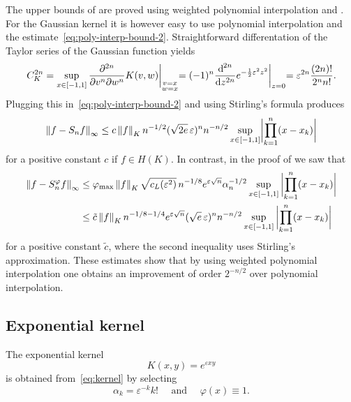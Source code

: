 \documentclass{mcom-l}
\numberwithin{equation}{section}
\numberwithin{theorem}{section} %
\begin{document}
The upper bounds of  are proved using weighted polynomial interpolation and .
For the Gaussian kernel it is however easy to use polynomial interpolation and the estimate~\eqref{eq:poly-interp-bound-2}.
Straightforward differentation of the Taylor series of the Gaussian function yields
\begin{equation*}
    C_K^{2n} = \sup_{x \in [-1, 1]} \frac{\partial^{2n}}{\partial v^n \partial w^n} K(v, w) \biggl|_{\substack{v = x \\ w = x}} = (-1)^n \frac{\dif^{\,2n}}{\dif z^{2n}} e^{-\frac{1}{2} \varepsilon^2 z^2} \biggl|_{z = 0} = \varepsilon^{2n} \frac{(2n)!}{2^n n!}.
\end{equation*}
Plugging this in~\eqref{eq:poly-interp-bound-2} and using Stirling's formula produces
\begin{equation*}
  \norm[0]{f - S_n f}_\infty \leq c \norm[0]{f}_K n^{-1/2} (\sqrt{2 e} \, \varepsilon)^{n} n^{-n/2} \sup_{x \in [-1, 1]} \abs[3]{ \prod_{k=1}^n (x - x_k) }
\end{equation*}
for a positive constant $c$ if $f \in H(K)$.
In contrast, in the proof of  we saw that
\begin{equation*}
  \begin{split}
  \norm[0]{ f - S_n^\varphi f }_\infty &\leq \varphi_{\max} \norm[0]{f}_K \sqrt{c_L(\varepsilon^2)} \, n^{-1/8} e^{\varepsilon\sqrt{n}} \alpha_n^{-1/2} \sup_{x \in [-1, 1]} \, \abs[3]{ \prod_{k=1}^n (x - x_k) } \\
  &\leq \tilde{c} \norm[0]{f}_K  n^{-1/8-1/4} e^{\varepsilon\sqrt{\smash[b]{n}}} (\sqrt{e} \, \varepsilon)^{n} n^{-n/2} \sup_{x \in [-1, 1]} \, \abs[3]{ \prod_{k=1}^n (x - x_k) }
  \end{split}
\end{equation*}
for a positive constant $\tilde{c}$, where the second inequality uses Stirling's approximation.
These estimates show that by using weighted polynomial interpolation one obtains an improvement of order $2^{-n/2}$ over polynomial interpolation.

\subsection{Exponential kernel}

The exponential kernel
\begin{equation} \label{eq:app-exp}
  K(x, y) = e^{\varepsilon x y}
\end{equation}
is obtained from~\eqref{eq:kernel} by selecting
\begin{equation*}
  \alpha_k = \varepsilon^{-k} k! \quad \text{ and } \quad \varphi(x) \equiv 1.
\end{equation*}
\end{document}
